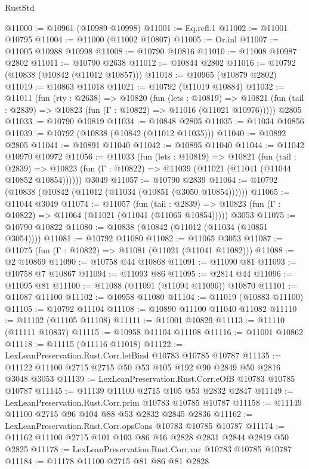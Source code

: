 \begin{lexlean}{RustStd}
\begin{coremodule}
@11000 := @10961 (@10989 @10998)
@11001 := Eq.refl.{1}
@11002 := @11001 @10795
@11004 := @11000 (@11002 @10807)
@11005 := Or.inl
@11007 := @11005 @10988 @10998
@11008 := @10790 @10816
@11010 := @11008 @10987 @2802
@11011 := @10790 @2638
@11012 := @10844 @2802
@11016 := @10792 (@10838 (@10842 (@11012 @10857)))
@11018 := @10965 (@10879 @2802)
@11019 := @10863 @11018
@11021 := @10792 (@11019 @10884)
@11032 := @11011
    (fun (rty : @2638) =>
    @10820
      (fun (lets : @10819) =>
      @10821 (fun (tail : @2839) => @10823 (fun (Γ : @10822) => @11016 (@11021 @10976)))))
    @2805
@11033 := @10790 @10819
@11034 := @10848 @2805
@11035 := @11034 @10856
@11039 := @10792 (@10838 (@10842 (@11012 @11035)))
@11040 := @10892 @2805
@11041 := @10891 @11040
@11042 := @10895 @11040
@11044 := @11042 @10970 @10972
@11056 := @11033
    (fun (lets : @10819) =>
    @10821
      (fun (tail : @2839) =>
      @10823 (fun (Γ : @10822) => @11039 (@11021 (@11041 (@11044 @10852 @10854))))))
    @3049
@11057 := @10790 @2839
@11064 := @10792 (@10838 (@10842 (@11012 (@11034 (@10851 (@3050 @10854))))))
@11065 := @11044 @3049
@11074 := @11057
    (fun (tail : @2839) => @10823 (fun (Γ : @10822) => @11064 (@11021 (@11041 (@11065 @10854)))))
    @3053
@11075 := @10790 @10822
@11080 := @10838 (@10842 (@11012 (@11034 (@10851 @3054))))
@11081 := @10792 @11080
@11082 := @11065 @3053
@11087 := @11075 (fun (Γ : @10822) => @11081 (@11021 (@11041 @11082)))
@11088 := @2 @10869
@11090 := @10758 @44 @10868
@11091 := @11090 @81
@11093 := @10758 @7 @10867
@11094 := @11093 @86
@11095 := @2814 @44
@11096 := @11095 @81
@11100 := @11088 (@11091 (@11094 @11096)) @10870
@11101 := @11087 @11100
@11102 := @10958 @11080
@11104 := @11019 (@10883 @11100)
@11105 := @10792 @11104
@11108 := @10890 @11100 @11040 @11082
@11110 := @11102 (@11105 @11108)
@11111 := @11001 @10829
@11113 := @11110 (@11111 @10837)
@11115 := @10958 @11104 @11108
@11116 := @11001 @10862
@11118 := @11115 (@11116 @11018)
@11122 := LexLeanPreservation.Rust.Corr.letBind @10783 @10785 @10787
@11135 := @11122 @11100 @2715 @2715 @50 @53 @105 @192 @90 @2849 @50 @2816 @3048 @3053
@11139 := LexLeanPreservation.Rust.Corr.eOfB @10783 @10785 @10787
@11145 := @11139 @11100 @2715 @105 @53 @2832 @2847
@11149 := LexLeanPreservation.Rust.Corr.prim @10783 @10785 @10787
@11158 := @11149 @11100 @2715 @96 @104 @88 @53 @2832 @2845 @2836
@11162 := LexLeanPreservation.Rust.Corr.opsCons @10783 @10785 @10787
@11174 := @11162 @11100 @2715 @101 @103 @86 @16 @2828 @2831 @2844 @2819 @50 @2825
@11178 := LexLeanPreservation.Rust.Corr.var @10783 @10785 @10787
@11184 := @11178 @11100 @2715 @81 @86 @81 @2828

\end{coremodule}
\end{lexlean}
